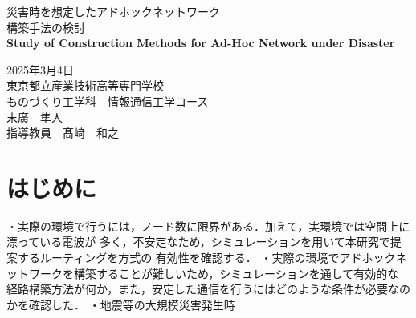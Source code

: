 \documentclass[a4paper, 11pt]{ltjsarticle}
\begin{document}
\fontsize{11pt}{14pt}\selectfont

\thispagestyle{empty}
\begin{center}

\vspace*{40mm}
{\huge\noindent 災害時を想定したアドホックネットワーク}\\
\medskip
{\huge\noindent 構築手法の検討}\\
\vspace{\baselineskip}
{\huge\noindent\textbf{Study of Construction Methods for Ad-Hoc Network under Disaster}}\\
\vspace{120mm}

{\huge\noindent
2025年3月4日\\
東京都立産業技術高等専門学校\\
ものづくり工学科　情報通信工学コース \\
末廣　隼人\\
指導教員　髙﨑　和之    \\
}
\vspace{40mm}

\end{center}

\clearpage  %
\thispagestyle{empty}
\tableofcontents  %

\clearpage
{}
\section{はじめに}

・実際の環境で行うには，ノード数に限界がある．加えて，実環境では空間上に漂っている電波が
多く，不安定なため，シミュレーションを用いて本研究で提案するルーティングを方式の
有効性を確認する．
・実際の環境でアドホックネットワークを構築することが難しいため，シミュレーションを通して有効的な
経路構築方法が何か，また，安定した通信を行うにはどのような条件が必要なのかを確認した．
・地震等の大規模災害発生時
\end{document}
